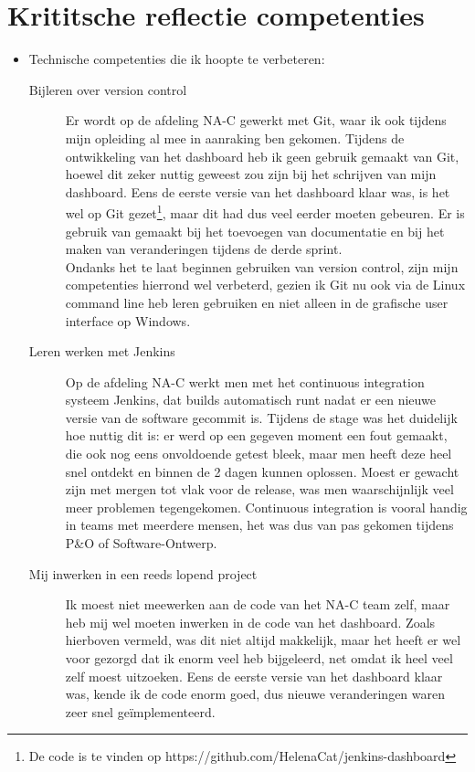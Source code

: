 \documentclass[10pt,a4paper]{article}
\begin{document}
\section{Krititsche reflectie competenties}
\label{reflectie}
\begin{itemize}
\item Technische competenties die ik hoopte te verbeteren:
\begin{description}
\item[Bijleren over version control] Er wordt op de afdeling NA-C gewerkt met Git, waar ik ook tijdens mijn opleiding al mee in aanraking ben gekomen. Tijdens de ontwikkeling van het dashboard heb ik geen gebruik gemaakt van Git, hoewel dit zeker nuttig geweest zou zijn bij het schrijven van mijn dashboard. Eens de eerste versie van het dashboard klaar was, is het wel op Git gezet\footnote{De code is te vinden op https://github.com/HelenaCat/jenkins-dashboard}, maar dit had dus veel eerder moeten gebeuren. Er is gebruik van gemaakt bij het toevoegen van documentatie en bij het maken van veranderingen tijdens de derde sprint.\\
Ondanks het te laat beginnen gebruiken van version control, zijn mijn competenties hierrond wel verbeterd, gezien ik Git nu ook via de Linux command line heb leren gebruiken en niet alleen in de grafische user interface op Windows. 
\item[Leren werken met Jenkins] Op de afdeling NA-C werkt men met het continuous integration systeem Jenkins, dat builds automatisch runt nadat er een nieuwe versie van de software gecommit is. Tijdens de stage was het duidelijk hoe nuttig dit is: er werd op een gegeven moment een fout gemaakt, die ook nog eens onvoldoende getest bleek, maar men heeft deze heel snel ontdekt en binnen de 2 dagen kunnen oplossen. Moest er gewacht zijn met mergen tot vlak voor de release, was men waarschijnlijk veel meer problemen tegengekomen. Continuous integration is vooral handig in teams met meerdere mensen, het was dus van pas gekomen tijdens P\&O of Software-Ontwerp. 
\item[Mij inwerken in een reeds lopend project] Ik moest niet meewerken aan de code van het NA-C team zelf, maar heb mij wel moeten inwerken in de code van het dashboard. Zoals hierboven vermeld, was dit niet altijd makkelijk, maar het heeft er wel voor gezorgd dat ik enorm veel heb bijgeleerd, net omdat ik heel veel zelf moest uitzoeken. Eens de eerste versie van het dashboard klaar was, kende ik de code enorm goed, dus nieuwe veranderingen waren zeer snel ge\"implementeerd.

\end{description}
\end{itemize}
\end{document}

